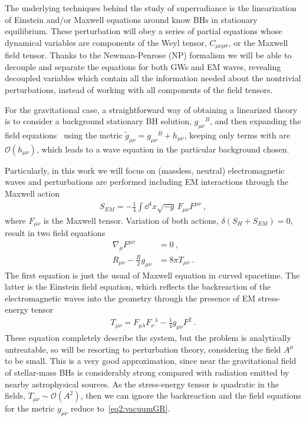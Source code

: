 The underlying techniques behind the study of superradiance is the linearization of Einstein and/or Maxwell equations around know BHs in stationary equilibrium.
These perturbation will obey a series of partial equations whose dynamical variables are components of the Weyl tensor, $C_{\mu\nu\rho\sigma}$, or the Maxwell field tensor. 
Thanks to the Newman-Penrose (NP) formalism we will be able to decouple and separate the equations for both GWs and EM waves, revealing decoupled variables which contain all the information needed about the nontrivial perturbations, instead of working with all components of the field tensors.

For the gravitational case, a straightforward way of obtaining a linearized theory is to consider a background stationary BH solution, $g_{\mu\nu}{}^B$, and then expanding the field equations~ using the metric $\tilde{g}_{\mu\nu} = g_{\mu\nu}{}^B + h_{\mu\nu}$, keeping only terms with are $\mathcal{O}(h_{\mu\nu})$, which leads to a wave equation in the particular background chosen. 

Particularly, in this work we will focus on (massless, neutral) electromagnetic waves and perturbations are performed including EM interactions through the Maxwell action
\begin{align}
    S_{EM} = - \frac{1}{4} \int \dd^4 x \sqrt{-g} \,F_{\mu\nu} F^{\mu\nu} ~,
     \label{eq2:actionEM}
\end{align}
where $F_{\mu\nu}$ is the Maxwell tensor.
Variation of both actions, $\delta(S_H + S_{EM}) = 0$, result in two field equations
\begin{align}
    \nabla_\mu F^{\mu\nu} &= 0 ~, \label{eq2:maxwellEM} \\
    R_{\mu\nu} - \frac{R}{2} g_{\mu\nu} &= 8 \pi T_{\mu\nu} \label{eq2:EM+GR}  ~.
\end{align}
The first equation is just the usual of Maxwell equation in curved spacetime.
The latter is the Einstein field equation, which reflects the backreaction of the electromagnetic waves into the geometry through the presence of EM stress-energy tensor
\begin{align}
    T_{\mu\nu} = F_{\mu\lambda} F_{\nu}{}^{\lambda} - \frac{1}{4} g_{\mu\nu} F^2  ~.
    \label{eq2:stressenergyEM}
\end{align}
These equation completely describe the system, but the problem is analytically untreatable, so will be resorting to perturbation theory, considering the field $A^\mu$ to be small. 
This is a very good approximation, since near the gravitational field of stellar-mass BHs  is considerably strong compared with radiation emitted by nearby astrophysical sources.
As the stress-energy tensor is quadratic in the fields, $T_{\mu\nu}\sim\mathcal{O}(A^2)$, then we can ignore the backreaction and the field equations for the metric $g_{\mu\nu}$ reduce to~\eqref{eq2:vacuumGR}.


